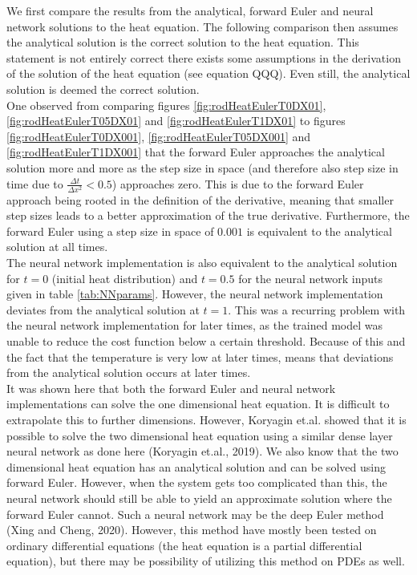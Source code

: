 \documentclass[12pt,a4paper]{article}
\begin{document}
\noindent We first compare the results from the analytical, forward Euler and neural network solutions to the heat equation. The following comparison then assumes the analytical solution is the correct solution to the heat equation. This statement is not entirely correct there exists some assumptions in the derivation of the solution of the heat equation (see equation QQQ). Even still, the analytical solution is deemed the correct solution. 
\\
One observed from comparing figures \ref{fig:rodHeatEulerT0DX01}, \ref{fig:rodHeatEulerT05DX01} and \ref{fig:rodHeatEulerT1DX01} to figures \ref{fig:rodHeatEulerT0DX001}, \ref{fig:rodHeatEulerT05DX001} and \ref{fig:rodHeatEulerT1DX001} that the forward Euler approaches the analytical solution more and more as the step size in space (and therefore also step size in time due to $\frac{\Delta t}{\Delta x^2} < 0.5$) approaches zero. This is due to the forward Euler approach being rooted in the definition of the derivative, meaning that smaller step sizes leads to a better approximation of the true derivative. Furthermore, the forward Euler using a step size in space of $0.001$ is equivalent to the analytical solution at all times.
\\
The neural network implementation is also equivalent to the analytical solution for $t = 0$ (initial heat distribution) and $t = 0.5$ for the neural network inputs given in table \ref{tab:NNparams}. However, the neural network implementation deviates from the analytical solution at $t = 1$. This was a recurring problem with the neural network implementation for later times, as the trained model was unable to reduce the cost function below a certain threshold. Because of this and the fact that the temperature is very low at later times, means that deviations from the analytical solution occurs at later times.
\\
It was shown here that both the forward Euler and neural network implementations can solve the one dimensional heat equation. It is difficult to extrapolate this to further dimensions. However, Koryagin et.al. showed that it is possible to solve the two dimensional heat equation using a similar dense layer neural network as done here (Koryagin et.al., 2019). We also know that the two dimensional heat equation has an analytical solution and can be solved using forward Euler. However, when the system gets too complicated than this, the neural network should still be able to yield an approximate solution where the forward Euler cannot. Such a neural network may be the deep Euler method (Xing and Cheng, 2020). However, this method have mostly been tested on ordinary differential equations (the heat equation is a partial differential equation), but there may be possibility of utilizing this method on PDEs as well. 
\end{document}
